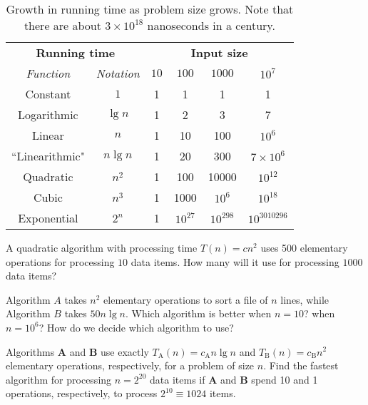 \begin{table}[htb] 
   \centering
   \caption{Growth in running time as problem size grows. Note that 
   there are about $3\times 10^{18}$ nanoseconds in a century.}
   \begin{tabular}{|c|c|cccc|} \hline 
   \multicolumn{2}{|c|}{\textbf{Running time}} &  
   \multicolumn{4}{c|}{\textbf{Input size}} 
\\ \cline{1-6} 
   \emph{Function}     & \emph{Notation} & $10$ & $100$ & $1000$ & $10^7$
\\ \hline 
   Constant     & $1$      & 1  & 1  &   1 &   1 \\ \hline 
   Logarithmic  & $\lg n$ & 1  & 2& 3 & 7  \\ \hline 
   Linear       & $n$ & 1 & 10 & 100 & $10^6$   \\ \hline 
``Linearithmic" & $n  \lg n$ & 1 & 20 & 300 & $7\times 10^6$ \\ \hline 
   Quadratic    & $n^{2}$ & 1 & 100 & 10000 & $10^{12}$ \\ \hline 
   Cubic        & $n^{3}$ & 1 & 1000 & $10^6$ &  $10^{18}$ \\ \hline 
   Exponential  & $2^{n}$ & 1 & $10^{27}$ & $10^{298} $ & $10^{3010296}$  \\ \hline 
   \end{tabular}
\end{table} 
 



\begin{Boxample}[4]
\label{exr:time-compl:2}
A quadratic algorithm with processing time \(T(n)=cn^2 \)
uses 500 elementary operations for processing $10$ data items. How many will it 
use for processing $1000$ data items? 
\end{Boxample}

\begin{Boxample}[4]
Algorithm $A$ takes $n^2$ elementary operations to sort a file of $n$ lines, while Algorithm $B$ takes $50n\lg n$. 
Which algorithm is better when $n = 10$? when $n=10^6$? How do we decide which algorithm to use?
\end{Boxample}

\begin{Boxample}[4]
\label{exr:time-compl:7A}
Algorithms \textbf{A} and \textbf{B} use exactly \(T_\mathrm{A}(n) = c_\mathrm{A} n \lg n\)
and \(T_\mathrm{B}(n) = c_\mathrm{B} n^{2}\) elementary operations, 
respectively, for a problem of size \(n\).
Find the fastest algorithm for processing \(n=2^{20}\) data items if
\textbf{A} and \textbf{B} spend 10 and 1 operations,
respectively, to process \(2^{10}\equiv 1024\) items.
\end{Boxample}


